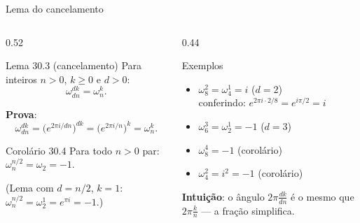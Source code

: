 \documentclass[aspectratio=169,10pt]{beamer}
\newcommand{\w}[2][n]{\omega_{#1}^{#2}}       %
\begin{document}
\begin{frame}{Lema do cancelamento}
  \begin{columns}[T]
    \begin{column}{0.52\textwidth}
      \begin{block}{Lema 30.3 (cancelamento)}
        Para inteiros $n>0$, $k\ge 0$ e $d>0$:
        \[
          \w[dn]{dk} = \w{k}.
        \]
      \end{block}
      \textbf{Prova}:
      \[
        \w[dn]{dk} = \big(e^{2\pi i/dn}\big)^{dk} = \big(e^{2\pi i/n}\big)^{k} = \w{k}.
      \]
      \begin{block}{Corolário 30.4}
        Para todo $n>0$ par: \quad $\w{n/2} = \omega_2 = -1$.
      \end{block}
      {\small (Lema com $d = n/2$, $k=1$: $\w{n/2} = \w[2]{1} = e^{\pi i} = -1$.)}
    \end{column}
    \begin{column}{0.44\textwidth}
      \begin{exampleblock}{Exemplos}
        \begin{itemize}
          \item $\w[8]{2} = \w[4]{1} = i$ \;\;($d=2$)\\
                {\small conferindo: $e^{2\pi i\cdot 2/8} = e^{i\pi/2} = i$}
          \item $\w[6]{3} = \w[2]{1} = -1$ \;\;($d=3$)
          \item $\w[8]{4} = -1$ \;\;(corolário)
          \item $\w[4]{2} = i^2 = -1$ \;\;(corolário)
        \end{itemize}
      \end{exampleblock}
      {\small \textbf{Intuição}: o ângulo $2\pi\frac{dk}{dn}$ é o mesmo que $2\pi\frac{k}{n}$ ---
      a fração simplifica.}
    \end{column}
  \end{columns}
\end{frame}
\end{document}
